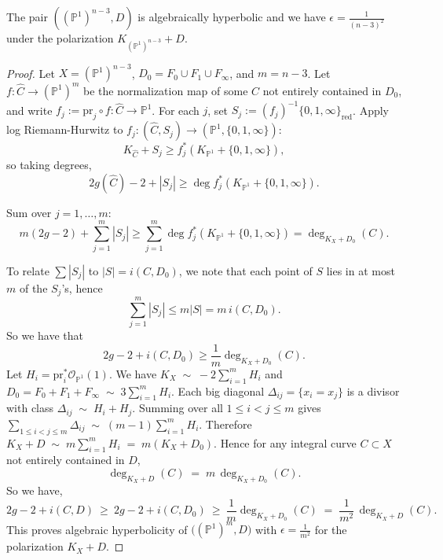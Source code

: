 \documentclass[10pt,a4paper]{amsart}
\newcommand{\PP}{\mathbb{P}}
\begin{document}
\begin{proposition}\label{propk}
The pair $((\mathbb P^1)^{n-3},D)$ is algebraically hyperbolic and we have $\epsilon = \frac 1{(n-3)^2}$ under the polarization $K_{(\mathbb P^1)^{n-3}}+D$.
\end{proposition}

\begin{proof}
Let $X = (\mathbb P^1)^{n-3}$, $D_0 = F_0\cup F_1\cup F_{\infty}$, and $m=n-3$. Let $f:\widehat C\to (\PP^1)^{m}$ be the normalization map of some $C$ not entirely contained in $D_0$, and write $f_j:=\mathrm{pr}_j\circ f:\widehat C\to\PP^1$.
For each $j$, set $S_j:=(f_j)^{-1}\{0,1,\infty\}_{\mathrm{red}}$. Apply log Riemann-Hurwitz to 
\( f_j : (\widehat{C}, S_j) \to (\PP^1, \{0,1,\infty\}) \):
\[
K_{\widehat{C}} + S_j \ge f_j^*(K_{\PP^1} + \{0,1,\infty\}),
\]
so taking degrees,
$$
2g(\widehat{C}) - 2 + |S_j| \ge \deg f_j^*(K_{\PP^1} + \{0,1,\infty\}).
$$

Sum over \( j = 1, \ldots, m \):
$$
m(2g - 2) + \sum_{j=1}^m |S_j|
\ge \sum_{j=1}^m \deg f_j^*(K_{\PP^1} + \{0,1,\infty\})
= \deg_{K_X + D_0}(C).
$$

To relate \( \sum |S_j| \) to \( |S| = i(C,D_0) \), we note that each point of \( S \) lies in at most \( m \) of the \( S_j \)'s, hence
\[
\sum_{j=1}^m |S_j| \le m |S| = m\, i(C,D_0).
\]
So we have that
$$
2g - 2 + i(C,D_0)\ge  \frac 1m\deg_{K_X + D_0}(C).
$$ 
Let $H_i=\mathrm{pr}_i^*\mathcal O_{\PP^1}(1)$.
We have
$
K_X \;\sim\; -2\sum_{i=1}^m H_i
$
and 
$
D_0 = F_0+F_1+F_\infty \;\sim\; 3\sum_{i=1}^m H_i.
$
Each big diagonal $\Delta_{ij}=\{x_i=x_j\}$ is a divisor with class
$
\Delta_{ij}\;\sim\; H_i+H_j.
$
Summing over all $1\le i<j\le m$ gives
$
\sum_{1\le i<j\le m}\Delta_{ij} \;\sim\; (m-1)\sum_{i=1}^m H_i.
$
Therefore
$
K_X+D\;\sim\; m\sum_{i=1}^m H_i
\;=\; m (K_X+D_0).
$
Hence for any integral curve $C\subset X$ not entirely contained in $D$,
\[
\deg_{K_X+D}(C) \;=\; m\,\deg_{K_X+D_0}(C).
\]
So we have,
\[
2g-2+i(C,D)\ \ge\ 2g-2+i(C,D_0)\ \ge\ \frac 1m\deg_{K_X+D_0}(C)
\;=\; \frac 1{m^2}\,\deg_{K_X+D}(C).
\]
This proves algebraic hyperbolicity of $\bigl((\PP^1)^m,D\bigr)$ with
$\epsilon=\frac1{m^2}$ for the polarization $K_X+D$.
\end{proof}
\end{document}
